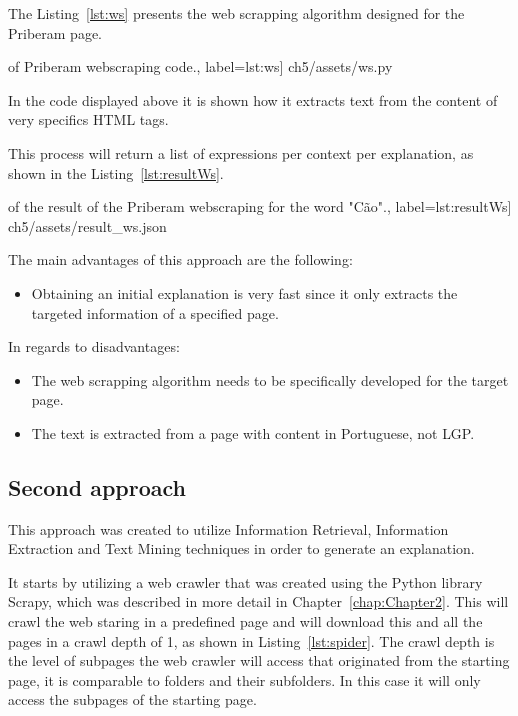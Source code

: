 The Listing~\ref{lst:ws} presents the web scrapping algorithm designed for the Priberam page.

\begin{center}
\begin{minipage}{0.95\linewidth}
 of Priberam webscraping code.,
label=lst:ws]
{ch5/assets/ws.py}
\end{minipage}
\end{center}

In the code displayed above it is shown how it extracts text from the content of very specifics HTML tags.

This process will return a list of expressions per context per explanation, as shown in the Listing~\ref{lst:resultWs}.

\begin{center}
\begin{minipage}{0.95\linewidth}
 of the result of the Priberam webscraping for the word "Cão".,
label=lst:resultWs]
{ch5/assets/result_ws.json}
\end{minipage}
\end{center}

The main advantages of this approach are the following:
\begin{itemize}
        \item Obtaining an initial explanation is very fast since it only extracts the targeted information of a specified page.
\end{itemize}

In regards to disadvantages:
\begin{itemize}
        \item The web scrapping algorithm needs to be specifically developed for the target page.
        \item The text is extracted from a page with content in Portuguese, not \gls{LGP}.
\end{itemize}

\subsection{Second approach}

This approach was created to utilize Information Retrieval, Information Extraction and Text Mining techniques in order to generate an explanation.

It starts by utilizing a web crawler that was created using the Python library Scrapy, which was described in more detail in Chapter~\ref{chap:Chapter2}.
This will crawl the web staring in a predefined page and will download this and all the pages in a crawl depth of 1, as shown in Listing~\ref{lst:spider}.
The crawl depth is the level of subpages the web crawler will access that originated from the starting page, it is comparable to folders and their subfolders.
In this case it will only access the subpages of the starting page.

